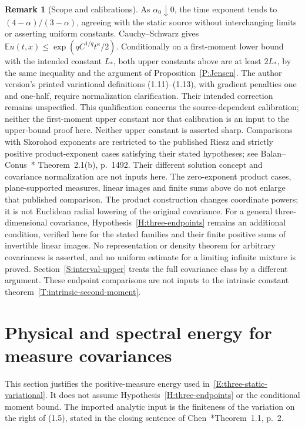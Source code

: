 \documentclass[12pt]{article}
\numberwithin{equation}{section}
\theoremstyle{definition}
\newtheorem{remark}[theorem]{Remark}
\newcommand{\E}{\mathbb{E}}
\begin{document}
\begin{remark}[Scope and calibrations]\label{R:three-endpoint-scope}
  As $\alpha_0\downarrow0$, the time exponent tends to
  $(4-\alpha)/(3-\alpha)$, agreeing with the static source without
  interchanging limits or asserting uniform constants. Cauchy--Schwarz gives
  $\E u(t,x)\le\exp(qC^{1/q}t^\kappa/2)$. Conditionally on a
  first-moment lower bound with the intended constant $L_*$, both
  upper constants above are at least $2L_*$, by the same inequality
  and the argument of Proposition~\ref{P:Jensen}. The author version's
  printed variational definitions (1.11)--(1.13), with gradient
  penalties one and one-half, require normalization clarification.
  Their intended correction remains unspecified. This
  qualification concerns the source-dependent calibration; neither
  the first-moment upper constant nor that calibration is an input
  to the upper-bound proof here. Neither upper constant is asserted sharp.
  Comparisons
  with Skorohod exponents are restricted to the published Riesz and
  strictly positive product-exponent cases satisfying their stated
  hypotheses; see Balan--Conus~\cite{balan.conus:16:intermittency}*{
  Theorem~2.1(b), p.~1492}. Their different solution concept and
  covariance normalization are not inputs here. The zero-exponent
  product cases, plane-supported measures, linear images and finite
  sums above do not enlarge that published comparison. The product
  construction changes coordinate powers; it is not Euclidean radial
  lowering of the original covariance. For a general three-dimensional
  covariance, Hypothesis~\ref{H:three-endpoints} remains an additional
  condition, verified here for the stated families and their finite
  positive sums of invertible linear images. No representation or
  density theorem for arbitrary covariances is asserted, and no
  uniform estimate for a limiting infinite mixture is proved.
  Section~\ref{S:interval-upper} treats the full covariance class by
  a different argument. These endpoint comparisons are not inputs to
  the intrinsic constant theorem~\ref{T:intrinsic-second-moment}.
\end{remark}

\section{Physical and spectral energy for measure covariances}
\label{S:energy-fidelity}

This section justifies the positive-measure energy used
in~\eqref{E:three-static-variational}. It does not assume
Hypothesis~\ref{H:three-endpoints} or the conditional moment bound.
The imported analytic input is the finiteness of the variation on the
right of (1.5), stated in the closing sentence of
Chen~\cite{chen:23:exponential}*{Theorem~1.1, p.~2}.
\end{document}
